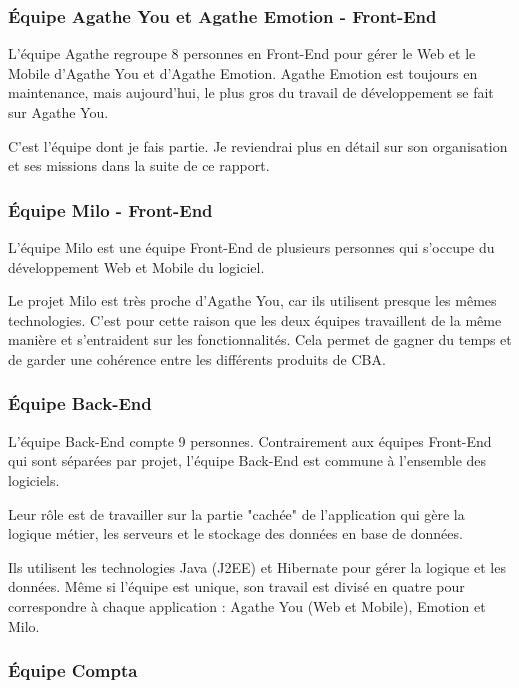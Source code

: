\documentclass{article}
\begin{document}
\subsubsection{Équipe Agathe You et Agathe Emotion - Front-End}

L'équipe Agathe regroupe 8 personnes en Front-End pour gérer le Web et le Mobile d'Agathe You et d'Agathe Emotion. Agathe Emotion est toujours en maintenance, mais aujourd'hui, le plus gros du travail de développement se fait sur Agathe You.

C'est l'équipe dont je fais partie. Je reviendrai plus en détail sur son organisation et ses missions dans la suite de ce rapport.

\subsubsection{Équipe Milo - Front-End}

L'équipe Milo est une équipe Front-End de plusieurs personnes qui s'occupe du développement Web et Mobile du logiciel.

Le projet Milo est très proche d'Agathe You, car ils utilisent presque les mêmes technologies. C'est pour cette raison que les deux équipes travaillent de la même manière et s'entraident sur les fonctionnalités. Cela permet de gagner du temps et de garder une cohérence entre les différents produits de CBA.

\subsubsection{Équipe Back-End}

L'équipe Back-End compte 9 personnes. Contrairement aux équipes Front-End qui sont séparées par projet, l'équipe Back-End est commune à l'ensemble des logiciels.

Leur rôle est de travailler sur la partie "cachée" de l'application qui gère la logique métier, les serveurs et le stockage des données en base de données.

Ils utilisent les technologies Java (J2EE) et Hibernate pour gérer la logique et les données. Même si l'équipe est unique, son travail est divisé en quatre pour correspondre à chaque application : Agathe You (Web et Mobile), Emotion et Milo.

\subsubsection{Équipe Compta}
\end{document}
